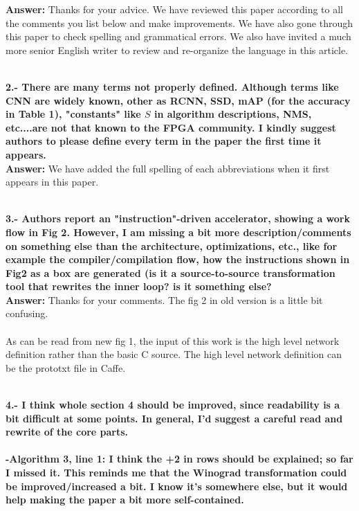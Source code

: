 \documentclass[12pt]{paper}
\newcommand{\rev}[1]{{{\color[rgb]{0,0,1}{#1}}}}
\newcommand{\answer}[1]{\noindent\textbf{Answer:} #1}
\newcommand{\comment}[1]{\noindent\textbf{\\ #1}\\}
\begin{document}
\answer{Thanks for your advice. We have reviewed this paper according to all the comments you list below and make improvements. We have also gone through this paper to check spelling and grammatical errors. We also have invited a much more senior English writer to review and re-organize the language in this article.}

\comment{2.- There are many terms not properly defined. Although terms like CNN are widely known, other as RCNN, SSD, mAP (for the accuracy in Table 1), "constants" like $S$ in algorithm descriptions, NMS, etc....are not that known to the FPGA community. I kindly suggest authors to please define every term in the paper the first time it appears.}

\answer{We have added the full spelling of each abbreviations when it first appears in this paper.
}
\rev{\\In Section 2, we have added the full spelling of RCNN, YOLO and SSD when they first appear. We have added a paragraph to introduce the evaluation of an image detection algorithm. The evaluating indicator is Mean Average Precision(mAP). In Section 4, the $S$ in the code stands for stride. To make it easier to understand, we set the $S$ to 1 in this article.
}

\comment{3.- Authors report an "instruction"-driven accelerator, showing a work flow in Fig 2. However, I am missing a bit more description/comments on something else than the architecture, optimizations, etc., like for example the compiler/compilation flow, how the instructions shown in Fig2 as a box are generated (is it a source-to-source transformation tool that rewrites the inner loop? is it something else? }

\answer{Thanks for your comments. The fig 2 in old version is a little bit confusing.\\
}
\rev{We have now replace the fig.2 in old version with the fig.1 in new version. Because the old fig 2 describes the workflow of this paper, we place the description of our workflow at the beginninng of this article(Section 1).}
{\\As can be read from new fig 1, the input of this work is the high level network definition rather than the  basic C source. The high level network definition can be the prototxt file in Caffe.
}

\comment{4.- I think whole section 4 should be improved, since readability is a bit difficult at some points. In general, I'd suggest a careful read and rewrite of the core parts. }
\comment{-Algorithm 3, line 1: I think the +2 in rows should be explained; so far I missed it. This reminds me that the Winograd transformation could be improved/increased a bit. I know it's somewhere else, but it would help making the paper a bit more self-contained.  }
\end{document}
